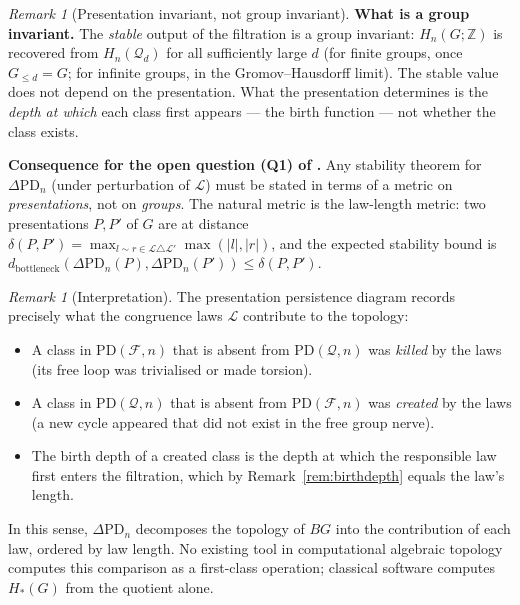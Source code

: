 \documentclass{article}
\theoremstyle{definition}
\theoremstyle{remark}
\newtheorem{remark}[theorem]{Remark}
\begin{document}
\begin{remark}[Presentation invariant, not group invariant]
\textbf{What is a group invariant.} The \emph{stable} output of the
filtration is a group invariant: $H_n(G; \mathbb{Z})$ is recovered
from $H_n(\mathcal{Q}_d)$ for all sufficiently large $d$ (for
finite groups, once $G_{{\leq}d} = G$; for infinite groups, in the
Gromov--Hausdorff limit). The stable value does not depend on the
presentation. What the presentation determines is the \emph{depth
at which} each class first appears --- the birth function --- not
whether the class exists.

\textbf{Consequence for the open question (Q1) of
.} Any stability theorem for
$\Delta\mathrm{PD}_n$ (under perturbation of $\mathcal{L}$) must
be stated in terms of a metric on \emph{presentations}, not on
\emph{groups}. The natural metric is the law-length metric: two
presentations $P, P'$ of $G$ are at distance
$\delta(P, P') = \max_{l \sim r \in \mathcal{L} \triangle \mathcal{L}'}
\max(|l|, |r|)$, and the expected stability bound is
$d_{\mathrm{bottleneck}}(\Delta\mathrm{PD}_n(P),
\Delta\mathrm{PD}_n(P')) \leq \delta(P, P')$.
\end{remark}

\begin{remark}[Interpretation]
The presentation persistence diagram records precisely what the
congruence laws $\mathcal{L}$ contribute to the topology:
\begin{itemize}
  \item A class in $\mathrm{PD}(\mathcal{F}, n)$ that is absent
        from $\mathrm{PD}(\mathcal{Q}, n)$ was \emph{killed} by
        the laws (its free loop was trivialised or made torsion).
  \item A class in $\mathrm{PD}(\mathcal{Q}, n)$ that is absent
        from $\mathrm{PD}(\mathcal{F}, n)$ was \emph{created} by
        the laws (a new cycle appeared that did not exist in the
        free group nerve).
  \item The birth depth of a created class is the depth at which
        the responsible law first enters the filtration, which
        by Remark~\ref{rem:birthdepth} equals the law's length.
\end{itemize}
In this sense, $\Delta\mathrm{PD}_n$ decomposes the topology
of $BG$ into the contribution of each law, ordered by law
length. No existing tool in computational algebraic topology
computes this comparison as a first-class operation; classical
software computes $H_*(G)$ from the quotient alone.
\end{remark}
\end{document}
